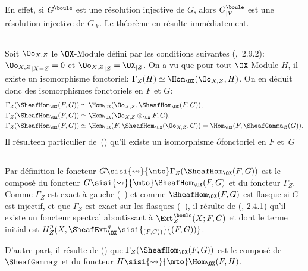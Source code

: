 En effet, si $G^\boule$ est une r\'esolution injective de $G$, alors $G^\boule_{|V}$ est une r\'esolution injective de $G_{|V}$. Le th\'eor\`eme en r\'esulte imm\'ediatement.

\subsection{} \label{VI.1.4}
Soit $\Oo_{X, Z}$ le $\OX$-Module d\'efini par les conditions suivantes (,~2.9.2): ${\Oo_{X, Z}}_{|X{-} Z}=0$ et ${\Oo_{X, Z}}_{|Z}={\OX}_{|Z}$. On a vu que pour tout $\OX$-Module $H$, il existe un isomorphisme fonctoriel: $\Gamma_Z(H)\simeq \Hom_{\OX}(\Oo_{X, Z}, H)$. On en d\'eduit donc des isomorphismes fonctoriels en $F$ et $G$: \setcounter{equation}{0}
\begin{align}
\label{VI.1.4.1}
\Gamma_Z(\SheafHom_{\OX}(F, G)) &\simeq \Hom_{\OX}(\Oo_{X, Z}, \SheafHom_{\OX}(F, G)),\\
\label{VI.1.4.2} \Gamma_Z(\SheafHom_{\OX}(F, G)) &\simeq \Hom_{\OX}(\Oo_{X, Z}\otimes_{\OX} F, G),\\
\label{VI.1.4.3} \Gamma_Z(\SheafHom_{\OX}(F, G)) &\simeq \Hom_{\OX}(F, \SheafHom_{\OX}(\Oo_{X, Z}, G))=\Hom_{\OX}(F, \SheafGamma_Z(G)).
\end{align}
Il r\'esulte\pageoriginale en particulier de~() qu'il existe un isomorphisme $\partial$\sisi{~}{-}fonctoriel en $F$ et~$G$ 

\subsection{} \label{VI.1.5}
Par d\'efinition le foncteur $G \sisi{\rightsquigarrow}{\mto} \Gamma_Z(\SheafHom_{\OX}(F, G))$ est le compos\'e du foncteur $G \sisi{\rightsquigarrow}{\mto}\SheafHom_{\OX}(F, G)$ et du foncteur $\Gamma_Z$. Comme $\Gamma_Z$ est exact \`a gauche (\sisi{,}{}~) et comme $\SheafHom_{\OX}(F, G)$ est flasque si $G$ est injectif, et que $\Gamma_Z$ est exact sur les flasques (\sisi{,}{}~), il r\'esulte de (, 2.4.1) qu'il existe un foncteur spectral aboutissant \`a $\Ext_{Z}^\boule(X;F, G)$ et dont le terme initial est $H_Z^p(X, \SheafExt_{\OX}^q\sisi{{}_{(F, G))}}{(F, G))}$.

D'autre part, il r\'esulte de () que $\Gamma_Z(\SheafHom_{\OX}(F, G))$ est le compos\'e de $\SheafGamma_Z$ et du foncteur $H \sisi{\rightsquigarrow}{\mto} \Hom_{\OX}(F, H)$.

